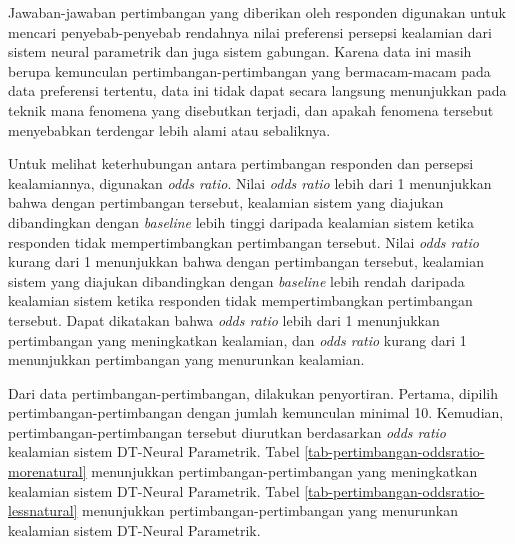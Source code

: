 Jawaban-jawaban pertimbangan yang diberikan oleh responden digunakan untuk mencari penyebab-penyebab rendahnya nilai preferensi persepsi kealamian dari sistem neural parametrik dan juga sistem gabungan. Karena data ini masih berupa kemunculan pertimbangan-pertimbangan yang bermacam-macam pada data preferensi tertentu, data ini tidak dapat secara langsung menunjukkan pada teknik mana fenomena yang disebutkan terjadi, dan apakah fenomena tersebut menyebabkan terdengar lebih alami atau sebaliknya.

Untuk melihat keterhubungan antara pertimbangan responden dan persepsi kealamiannya, digunakan \textit{odds ratio}. Nilai \textit{odds ratio} lebih dari 1 menunjukkan bahwa dengan pertimbangan tersebut, kealamian sistem yang diajukan dibandingkan dengan \textit{baseline} lebih tinggi daripada kealamian sistem ketika responden tidak mempertimbangkan pertimbangan tersebut. Nilai \textit{odds ratio} kurang dari 1 menunjukkan bahwa dengan pertimbangan tersebut, kealamian sistem yang diajukan dibandingkan dengan \textit{baseline} lebih rendah daripada kealamian sistem ketika responden tidak mempertimbangkan pertimbangan tersebut. Dapat dikatakan bahwa \textit{odds ratio} lebih dari 1 menunjukkan pertimbangan yang meningkatkan kealamian, dan \textit{odds ratio} kurang dari 1 menunjukkan pertimbangan yang menurunkan kealamian.

Dari data pertimbangan-pertimbangan, dilakukan penyortiran. Pertama, dipilih pertimbangan-pertimbangan dengan jumlah kemunculan minimal 10. Kemudian, pertimbangan-pertimbangan tersebut diurutkan berdasarkan \textit{odds ratio} kealamian sistem DT-Neural Parametrik. Tabel \ref{tab-pertimbangan-oddsratio-morenatural} menunjukkan pertimbangan-pertimbangan yang meningkatkan kealamian sistem DT-Neural Parametrik. Tabel \ref{tab-pertimbangan-oddsratio-lessnatural} menunjukkan pertimbangan-pertimbangan yang menurunkan kealamian sistem DT-Neural Parametrik.

